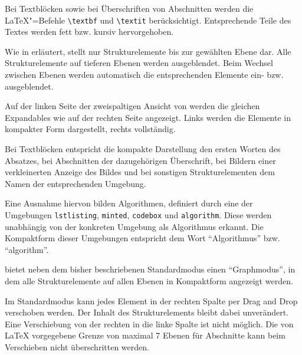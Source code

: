 
Bei Textblöcken sowie bei Überschriften von Abschnitten werden die \LaTeX"=Befehle \verb|\textbf| und \verb|\textit|
berücksichtigt.
Entsprechende Teile des Textes werden fett bzw. kursiv hervorgehoben.


Wie in  erläutert, stellt \texla{} nur Strukturelemente bis zur gewählten Ebene dar.
Alle Strukturelemente auf tieferen Ebenen werden ausgeblendet.
Beim Wechsel zwischen Ebenen werden automatisch die entsprechenden Elemente ein- bzw. ausgeblendet.

\clearpage


Auf der linken Seite der zweispaltigen Ansicht von \texla{} werden die gleichen Expandables wie auf der rechten Seite
angezeigt.
Links werden die Elemente in kompakter Form dargestellt, rechts vollständig.

Bei Textblöcken entspricht die kompakte Darstellung den ersten Worten des Absatzes, bei Abschnitten der dazugehörigen
Überschrift, bei Bildern einer verkleinerten Anzeige des Bildes und bei sonstigen Strukturelementen dem Namen der
entsprechenden Umgebung.

Eine Ausnahme hiervon bilden Algorithmen, definiert durch eine der Umgebungen \verb|lstlisting|, \verb|minted|,
\verb|codebox| und \verb|algorithm|.
Diese werden unabhängig von der konkreten Umgebung als Algorithmus erkannt.
Die Kompaktform dieser Umgebungen entspricht dem Wort \enquote{Algorithmus} bzw. \enquote{algorithm}.


\texla{} bietet neben dem bisher beschriebenen Standardmodus einen \enquote{Graphmodus}, in dem alle Strukturelemente
auf allen Ebenen in Kompaktform angezeigt werden.


Im Standardmodus kann jedes Element in der rechten Spalte per Drag and Drop verschoben werden.
Der Inhalt des Strukturelements bleibt dabei unverändert.
Eine Verschiebung von der rechten in die linke Spalte ist nicht möglich.
Die von \LaTeX{} vorgegebene Grenze von maximal 7 Ebenen für Abschnitte kann beim Verschieben nicht überschritten
werden.

